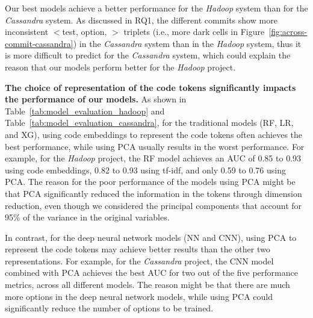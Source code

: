 Our best models achieve a better performance for the \emph{Hadoop} system 
than for the \emph{Cassandra} system. %
As discussed in RQ1, the different commits show more inconsistent $<$test, option, \inconsistent$>$ triplets (i.e., more dark cells in Figure~\ref{fig:across-commit-cassandra}) in the \emph{Cassandra} system than in the \emph{Hadoop} system, thus it is more difficult to predict \inconsistent for the \emph{Cassandra} system, which could explain the reason that our models perform better for the \emph{Hadoop} project. 

\noindent \textbf{The choice of representation of the code tokens significantly impacts the performance of our models.} As shown in Table~\ref{tab:model_evaluation_hadoop} and Table~\ref{tab:model_evaluation_cassandra}, for the traditional models (RF, LR, and XG), using code embeddings to represent the code tokens often achieves the best performance, while using PCA usually results in the worst performance. For example, for the \emph{Hadoop} project, the RF model achieves an AUC of 0.85 to 0.93 using code embeddings, 0.82 to 0.93 using tf-idf, and only 0.59 to 0.76 using PCA. The reason for the poor performance of the models using PCA might be that PCA significantly reduced the information in the tokens through dimension reduction, even though we considered the principal components that account for 95\% of the variance in the original variables.

In contrast, for the deep neural network models (NN and CNN), using PCA to represent the code tokens may achieve better results than the other two representations. For example, for the \emph{Cassandra} project, the CNN model combined with PCA achieves the best AUC for two out of the five performance metrics, across all different models.
The reason might be that there are much more options  in the deep neural network models, while using PCA could significantly reduce the number of options to be trained.


